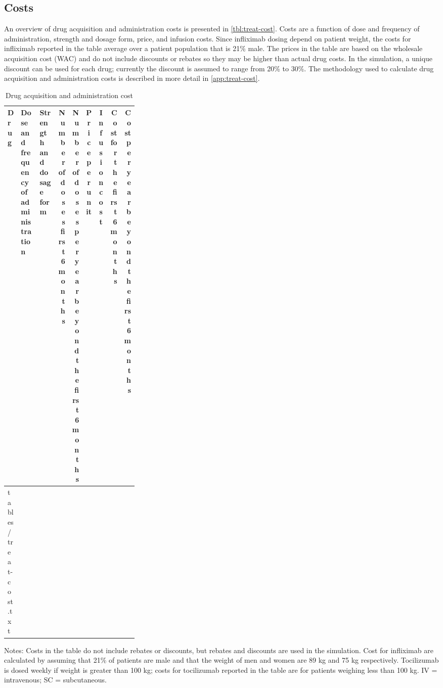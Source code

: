 \documentclass[11pt,final,fleqn]{article}\usepackage[]{graphicx}\usepackage[]{color}
\makeatletter
\theoremstyle{plain}
\newcommand*\ExpandableInput[1]{\@@input#1 }
\makeatother
\begin{document}
\FloatBarrier

\subsection{Costs}\label{cost}


An overview of drug acquisition and administration costs is presented in \autoref{tbl:treat-cost}. Costs are a function of dose and frequency of administration, strength and dosage form, price, and infusion costs. Since infliximab dosing depend on patient weight, the costs for infliximab reported in the table average over a patient population that is 21\% male. The prices in the table are based on the wholesale acquisition cost (WAC) and do not include discounts or rebates so they may be higher than actual drug costs. In the simulation, a unique discount can be used for each drug; currently the discount is assumed to range from 20\% to 30\%. The methodology used to calculate drug acquisition and administration costs is described in more detail in \autoref{app:treat-cost}. 

\begin{table}
\begin{center}
\begin{threeparttable}
\caption{Drug acquisition and administration cost} \label{tbl:treat-cost}
\scriptsize
\begin{tabular}{lp{0.15\linewidth}p{0.15\linewidth}rrrrrr}
\hline
\multicolumn{1}{l}{Drug} &
\multicolumn{1}{p{0.15\linewidth}}{Dose and frequency of administration} & 
\multicolumn{1}{p{0.15\linewidth}}{Strength and dosage form} & 
\multicolumn{1}{p{0.08\linewidth}}{Number of doses first 6 months}  & 
\multicolumn{1}{p{0.08\linewidth}}{Number of doses per year beyond the first 6 months} & 
\multicolumn{1}{c}{Price per unit} & \multicolumn{1}{c}{Infusion cost} & 
\multicolumn{1}{p{0.08\linewidth}}{Cost for the first 6 months} &
\multicolumn{1}{p{0.08\linewidth}}{Cost per year beyond the first 6 months}\\
\hline
\ExpandableInput{tables/treat-cost.txt}
\hline
\end{tabular}
\tiny
Notes: Costs in the table do not include rebates or discounts, but rebates and discounts are used in the simulation. Cost for infliximab are calculated by assuming that 21\% of patients are male and that the weight of men and women are 89 kg and 75 kg respectively. Tocilizumab is dosed weekly if weight is greater than 100 kg; costs for tocilizumab reported in the table are for patients weighing less than 100 kg. IV = intravenous; SC = subcutaneous. 
\end{threeparttable}
\end{center}
\end{table}
\end{document}
